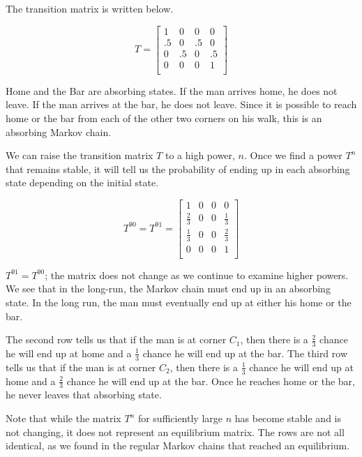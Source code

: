 \begin{solution}
    The transition matrix is written below.

    \[
        T = \begin{bmatrix}
            1  & 0  & 0  & 0  \\
            .5 & 0  & .5 & 0  \\
            0  & .5 & 0  & .5 \\
            0  & 0  & 0  & 1  \\
        \end{bmatrix}
    \]

    Home and the Bar are absorbing states. If the man arrives home, he does not leave. If the man arrives at the bar, he does not leave. Since it is possible to reach home or the bar from each of the other two corners on his walk, this is an absorbing Markov chain.

    We can raise the transition matrix \( T \) to a high power, \( n \). Once we find a power \( T^n \) that remains stable, it will tell us the probability of ending up in each absorbing state depending on the initial state.

    \[
        T^{90} = T^{91} = \begin{bmatrix}
            1           & 0 & 0 & 0           \\
            \frac{2}{3} & 0 & 0 & \frac{1}{3} \\
            \frac{1}{3} & 0 & 0 & \frac{2}{3} \\
            0           & 0 & 0 & 1           \\
        \end{bmatrix}
    \]

    \( T^{91} = T^{90} \); the matrix does not change as we continue to examine higher powers. We see that in the long-run, the Markov chain must end up in an absorbing state. In the long run, the man must eventually end up at either his home or the bar.

    The second row tells us that if the man is at corner $C_1$, then there is a $\frac{2}{3}$ chance he will end up at home and a $\frac{1}{3}$ chance he will end up at the bar. The third row tells us that if the man is at corner $C_2$, then there is a $\frac{1}{3}$ chance he will end up at home and a $\frac{2}{3}$ chance he will end up at the bar. Once he reaches home or the bar, he never leaves that absorbing state.

    Note that while the matrix $T^n$ for sufficiently large $n$ has become stable and is not changing, it does not represent an equilibrium matrix. The rows are not all identical, as we found in the regular Markov chains that reached an equilibrium.


\end{solution}
